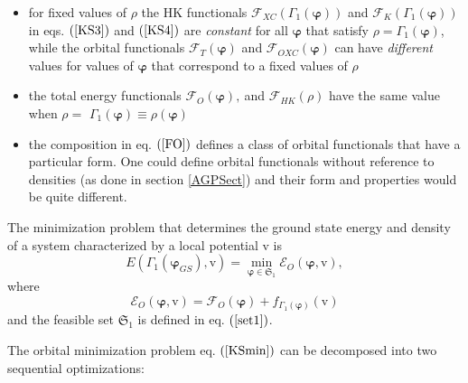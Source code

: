\documentclass[aps,preprint]{revtex4}%
\begin{document}
\begin{itemize}
\item for fixed values of $\rho$ the HK functionals $\mathcal{F}_{XC}\left(
\Gamma_{1}\left(  \boldsymbol{\varphi}\right)  \right)  $ and $\mathcal{F}%
_{K}\left(  \Gamma_{1}\left(  \boldsymbol{\varphi}\right)  \right)  $ in eqs.
$\left(  \ref{KS3}\right)  $ and $\left(  \ref{KS4}\right)  $ are
\emph{constant} for all $\boldsymbol{\varphi}$ that satisfy $\rho=\Gamma
_{1}\left(  \boldsymbol{\varphi}\right)  $, while the orbital functionals
$\mathcal{F}_{T}\left(  \boldsymbol{\varphi}\right)  $ and $\mathcal{F}%
_{OXC}\left(  \boldsymbol{\varphi}\right)  $ can have \emph{different} values
for values of $\boldsymbol{\varphi}$ that correspond to a fixed values of
$\rho$

\item the total energy functionals $\mathcal{F}_{O}\left(  \boldsymbol{\varphi
}\right)  ,\mathcal{\ }$and $\mathcal{F}_{HK}\left(  \rho\right)  $ have the
same value when $\rho=$ $\Gamma_{1}\left(  \boldsymbol{\varphi}\right)
\equiv\rho\left(  \boldsymbol{\varphi}\right)  $

\item the composition in eq. $\left(  \ref{FO}\right)  $ defines a class of
orbital functionals that have a particular form. One could define orbital
functionals without reference to densities (as done in section \ref{AGPSect})
and their form and properties would be quite different.
\end{itemize}

The minimization problem that determines the ground state energy and density
of a system characterized by a local potential $\mathrm{v}$ is
\begin{equation}
E\left(  \Gamma_{1}\left(  \boldsymbol{\varphi}_{GS}\right)  \boldsymbol{,}%
\mathrm{v}\right)  =\min_{\boldsymbol{\varphi\in}\mathfrak{S}_{1}}%
\mathcal{E}_{O}\left(  \boldsymbol{\varphi,}\mathrm{v}\right)  , \label{KSmin}%
\end{equation}
where
\begin{equation}
\mathcal{E}_{O}\left(  \boldsymbol{\varphi,}\mathrm{v}\right)  =\mathcal{F}%
_{O}\left(  \boldsymbol{\varphi}\right)  +f_{\Gamma_{1}\left(
\boldsymbol{\varphi}\right)  }\left(  \mathrm{v}\right)
\end{equation}
and the feasible set $\mathfrak{S}_{1}$ is defined in eq. $\left(
\ref{set1}\right)  $.

The orbital minimization problem eq. $\left(  \ref{KSmin}\right)  $ can be
decomposed into two sequential optimizations:
\end{document}
